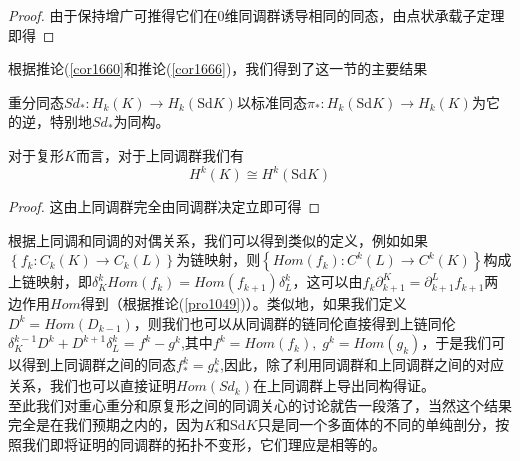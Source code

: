 \begin{proof}
由于保持增广可推得它们在0维同调群诱导相同的同态，由点状承载子定理即得
\end{proof}
根据推论(\ref{cor1660}和推论(\ref{cor1666})，我们得到了这一节的主要结果
\begin{corollary}[同调群的重分不变性]
重分同态$Sd_{*}:H_{k}(K)\rightarrow H_{k}(\text{Sd}K)$以标准同态$\pi_{*}:H_{k}(\text{Sd}K)\rightarrow H_{k}(K)$为它的逆，特别地$Sd_{*}$为同构。
\end{corollary}
\begin{corollary}
对于复形$K$而言，对于上同调群我们有
\begin{equation*}
    H^{k}(K)\cong H^{k}(\text{Sd}K)
\end{equation*}
\end{corollary}
\begin{proof}
这由上同调群完全由同调群决定立即可得
\end{proof}
根据上同调和同调的对偶关系，我们可以得到类似的定义，例如如果$\left\{f_{k}:C_{k}(K)\rightarrow C_{k}(L)\right\}$为链映射，则$\left\{Hom(f_{k}):C^{k}(L)\rightarrow C^{k}(K)\right\}$构成上链映射，即$\delta^{k}_{K}Hom(f_{k})=Hom(f_{k+1})\delta^{k}_{L}$，这可以由$f_{k}\partial_{k+1}^{K}=\partial^{L}_{k+1}f_{k+1}$两边作用$Hom$得到（根据推论(\ref{pro1049})）。类似地，如果我们定义$D^{k}=Hom(D_{k-1})$，则我们也可以从同调群的链同伦直接得到上链同伦$\delta^{k-1}_{K}D^{k}+D^{k+1}\delta^{k}_{L}=f^{k}-g^{k}$,其中$f^{k}=Hom(f_{k}),\;g^{k}=Hom(g_{k})$，于是我们可以得到上同调群之间的同态$f^{k}_{*}=g^{k}_{*}$,因此，除了利用同调群和上同调群之间的对应关系，我们也可以直接证明$Hom(Sd_{k})$在上同调群上导出同构得证。\\
至此我们对重心重分和原复形之间的同调关心的讨论就告一段落了，当然这个结果完全是在我们预期之内的，因为$K$和$\text{Sd}K$只是同一个多面体的不同的单纯剖分，按照我们即将证明的同调群的拓扑不变形，它们理应是相等的。
